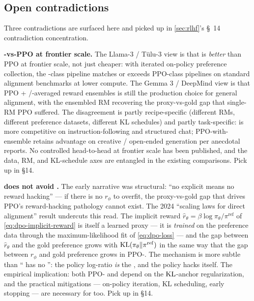 \subsection{Open contradictions}
\label{sec:dpo-contradictions}

Three contradictions are surfaced here and picked up in \cref{sec:rlhf}'s
\S~14 contradiction concentration.

\begin{contradiction}
\textbf{-vs-PPO at frontier scale.} The Llama-3 / T\"ulu-3 view
\citep{meta-llama3, tulu3} is that  is \emph{better} than PPO at
frontier scale, not just cheaper: with iterated on-policy preference
collection, the -class pipeline matches or exceeds PPO-class
pipelines on standard alignment benchmarks at lower compute. The
Gemma 3 / DeepMind view \citep{gemma3, warm-2024, warp-2024} is that
PPO + /-averaged reward ensembles is still the production
choice for general alignment, with the ensembled RM recovering the
proxy-vs-gold gap that single-RM PPO suffered. The disagreement is
partly recipe-specific (different RMs, different preference datasets,
different KL schedules) and partly task-specific:  is more
competitive on instruction-following and structured chat;
PPO-with-ensemble retains advantage on creative / open-ended
generation per anecdotal reports. No controlled head-to-head at
frontier scale has been published, and the data, RM, and KL-schedule
axes are entangled in the existing comparisons. Pick up in \S 14.
\end{contradiction}

\begin{contradiction}
\textbf{ does not avoid .} The early 
narrative was structural: ``no explicit  means no reward
hacking'' --- if there is no $r_\phi$ to overfit, the proxy-vs-gold
gap that drives PPO's reward-hacking pathology cannot exist. The
2024 ``scaling laws for direct alignment'' result
 undercuts this read. The implicit
reward $\hat r_\theta = \beta \log \pi_\theta / \pi^{\mathrm{ref}}$ of
\cref{eq:dpo-implicit-reward} is itself a learned proxy --- it is
\emph{trained} on the preference data through the maximum-likelihood
fit of \cref{eq:dpo-loss} --- and the gap between $\hat r_\theta$ and
the gold preference grows with $\operatorname{KL}(\pi_\theta \| \pi^{\mathrm{ref}})$
in the same way that the gap between $r_\phi$ and gold preference
grows in PPO-. The mechanism is more subtle than `` has no
'': the policy log-ratio \emph{is} the , and
the policy hacks itself. The empirical implication: both
PPO- and  depend on the $\operatorname{KL}$-anchor regularization,
and the practical mitigations --- on-policy iteration, KL
scheduling, early stopping --- are necessary for  too. Pick up
in \S 14.
\end{contradiction}

